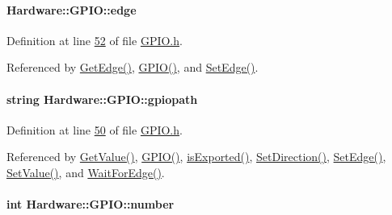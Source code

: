 \paragraph[{edge}]{ Hardware\+::\+G\+P\+I\+O\+::edge\hspace{0.3cm}{\ttfamily [private]}}\label{class_hardware_1_1_g_p_i_o_adf15f74f053069029e99934e28c109e0}


Definition at line \hyperlink{_g_p_i_o_8h_source_l00052}{52} of file \hyperlink{_g_p_i_o_8h_source}{G\+P\+I\+O.\+h}.



Referenced by \hyperlink{_g_p_i_o_8cpp_source_l00083}{Get\+Edge()}, \hyperlink{_g_p_i_o_8cpp_source_l00011}{G\+P\+I\+O()}, and \hyperlink{_g_p_i_o_8cpp_source_l00084}{Set\+Edge()}.

\hypertarget{class_hardware_1_1_g_p_i_o_ac47062ed6aba52b9e8506e1575bf5061}{}
\paragraph[{gpiopath}]{\setlength{\rightskip}{0pt plus 5cm}string Hardware\+::\+G\+P\+I\+O\+::gpiopath\hspace{0.3cm}{\ttfamily [private]}}\label{class_hardware_1_1_g_p_i_o_ac47062ed6aba52b9e8506e1575bf5061}


Definition at line \hyperlink{_g_p_i_o_8h_source_l00050}{50} of file \hyperlink{_g_p_i_o_8h_source}{G\+P\+I\+O.\+h}.



Referenced by \hyperlink{_g_p_i_o_8cpp_source_l00074}{Get\+Value()}, \hyperlink{_g_p_i_o_8cpp_source_l00011}{G\+P\+I\+O()}, \hyperlink{_g_p_i_o_8cpp_source_l00089}{is\+Exported()}, \hyperlink{_g_p_i_o_8cpp_source_l00078}{Set\+Direction()}, \hyperlink{_g_p_i_o_8cpp_source_l00084}{Set\+Edge()}, \hyperlink{_g_p_i_o_8cpp_source_l00075}{Set\+Value()}, and \hyperlink{_g_p_i_o_8cpp_source_l00037}{Wait\+For\+Edge()}.

\hypertarget{class_hardware_1_1_g_p_i_o_a1671a87bb70911b0a6a29019a068cf96}{}
\paragraph[{number}]{\setlength{\rightskip}{0pt plus 5cm}int Hardware\+::\+G\+P\+I\+O\+::number}\label{class_hardware_1_1_g_p_i_o_a1671a87bb70911b0a6a29019a068cf96}


